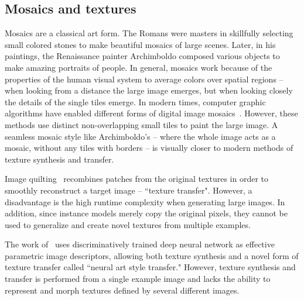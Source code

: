 \documentclass{article}
\begin{document}
\subsection{Mosaics and textures}
Mosaics are a classical art form. The Romans were masters in skillfully selecting small colored stones to make beautiful mosaics of large scenes. Later, in his paintings, the Renaissance painter Archimboldo composed various objects to make amazing portraits of people. In general, mosaics work because of the properties of the human visual system to average colors over spatial regions -- when looking from a distance the large image emerges, but when looking closely the details of the single tiles emerge. In modern times, computer graphic algorithms have enabled different forms of digital image mosaics~\cite{photomosaic,JIM}.  However, these methods use distinct non-overlapping small tiles to paint the large image. A seamless mosaic style like Archimboldo's -- where the whole image acts as a mosaic, without any tiles with borders -- is visually closer to modern methods of texture synthesis and transfer.

Image quilting~\cite{EfrosQ} recombines patches from the original textures in order to smoothly reconstruct a target image -- ``texture transfer". However, a disadvantage is the high runtime complexity when generating large images. In addition, since instance models merely copy the original pixels, they cannot be used to generalize and create novel textures from multiple examples.

The work of~\cite{GatysEB15a} uses discriminatively trained deep neural network as effective parametric image descriptors, allowing both texture synthesis and a novel form of texture transfer called ``neural art style transfer." However, texture synthesis and transfer is performed from a single example image and lacks  the ability to represent and morph textures defined by several different images.

\end{document}
